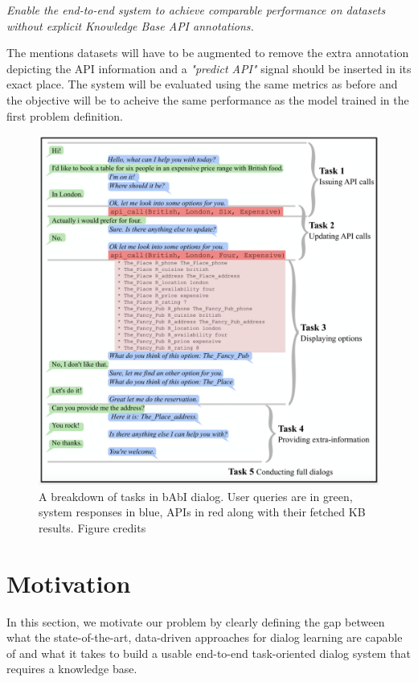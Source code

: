  {\em Enable the end-to-end system to achieve comparable performance on datasets without explicit Knowledge Base API annotations.}

The mentions datasets will have to be augmented to remove the extra annotation depicting the API information and a {\em"predict API"} signal should be inserted in its exact place. The system will be evaluated using the same metrics as before and the objective will be to acheive the same performance as the model trained in the first problem definition.

\begin{figure}
\centering

 \includegraphics[width=\linewidth]{assets/figures/dialog_sample.png}

\caption{A breakdown of tasks in bAbI dialog. User queries are in green, system responses in blue, APIs in red along with their fetched KB results. Figure credits \cite{bordes2016learning}}
\label{fig:sampledialog}
\end{figure}

\section{Motivation}
In this section, we motivate our problem by clearly defining the gap between what the state-of-the-art, data-driven approaches for dialog learning are capable of and what it takes to build a usable end-to-end task-oriented dialog system that requires a knowledge base.

